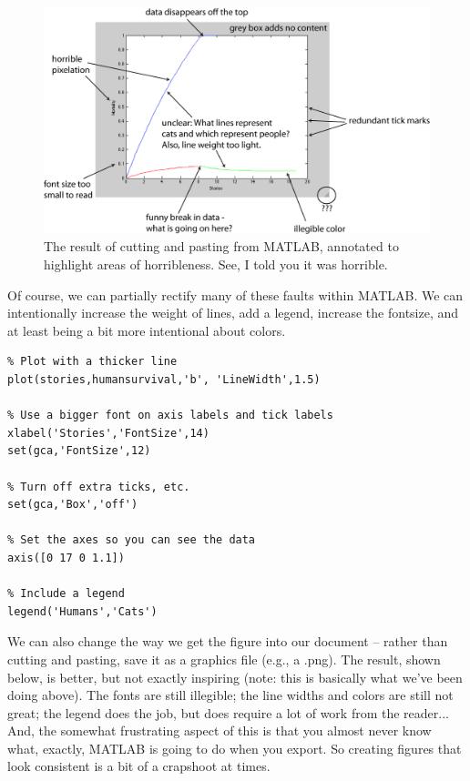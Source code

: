 \documentclass{tufte-handout}
\begin{document}
\begin{figure}[h!]
\includegraphics[width=6.5in]{figs/uglycatfigureannotated}
\caption{The result of cutting and pasting from MATLAB, annotated to highlight areas of horribleness.  See, I told you it was horrible.}
\label{fig:uglycatfigure}
\end{figure}

Of course, we can partially rectify many of these faults within MATLAB. We can intentionally increase the weight of lines, add a legend, increase the fontsize, and at least being a bit more intentional about colors.

\begin{verbatim}
% Plot with a thicker line
plot(stories,humansurvival,'b', 'LineWidth',1.5) 

% Use a bigger font on axis labels and tick labels
xlabel('Stories','FontSize',14) 
set(gca,'FontSize',12)

% Turn off extra ticks, etc.
set(gca,'Box','off') 

% Set the axes so you can see the data
axis([0 17 0 1.1])

% Include a legend
legend('Humans','Cats') 
\end{verbatim}


We can also change the way we get the figure into our document -- rather than cutting and pasting, save it as a graphics file (e.g., a .png).  The result, shown below, is better, but not exactly inspiring (note: this is basically what we've been doing above).  The fonts are still illegible; the line widths and colors are still not great; the legend does the job, but does require a lot of work from the reader... And, the somewhat frustrating aspect of this is that you almost never know what, exactly, MATLAB is going to do when you export.   So creating figures that look consistent is a bit of a crapshoot at times.
\end{document}
